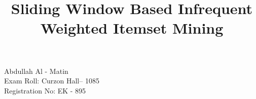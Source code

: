 \documentclass[12pt,a4paper,oneside]{csedu}  %
\begin{document}
\frontmatter      %

\title{Sliding Window Based Infrequent Weighted Itemset Mining}
\authors  %
{Abdullah Al - Matin  \\Exam Roll: Curzon Hall-- 1085\\Registration No: EK - 895}



\maketitle



\fancyhead{}  %
\rhead{\thepage}  %
\lhead{}  %

\pagestyle{fancy}  %
\end{document}
